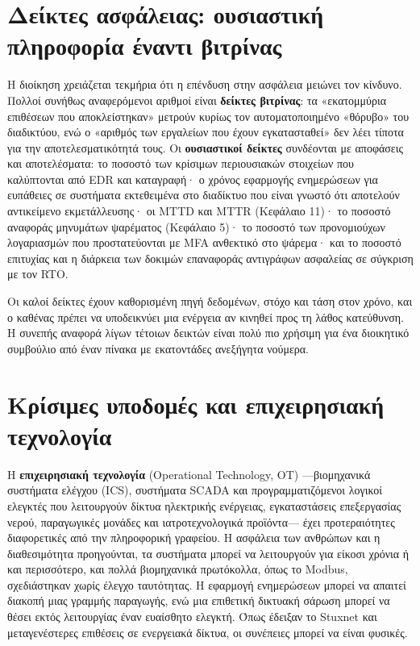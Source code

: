 \section{Δείκτες ασφάλειας: ουσιαστική πληροφορία έναντι βιτρίνας}\label{sec:13.5}
Η διοίκηση χρειάζεται τεκμήρια ότι η επένδυση στην ασφάλεια μειώνει τον κίνδυνο. Πολλοί συνήθως αναφερόμενοι αριθμοί είναι \textbf{δείκτες βιτρίνας}: τα «εκατομμύρια επιθέσεων που αποκλείστηκαν» μετρούν κυρίως τον αυτοματοποιημένο «θόρυβο» του διαδικτύου, ενώ ο «αριθμός των εργαλείων που έχουν εγκατασταθεί» δεν λέει τίποτα για την αποτελεσματικότητά τους. Οι \textbf{ουσιαστικοί δείκτες} συνδέονται με αποφάσεις και αποτελέσματα: το ποσοστό των κρίσιμων περιουσιακών στοιχείων που καλύπτονται από EDR και καταγραφή· ο χρόνος εφαρμογής ενημερώσεων για ευπάθειες σε συστήματα εκτεθειμένα στο διαδίκτυο που είναι γνωστό ότι αποτελούν αντικείμενο εκμετάλλευσης· οι MTTD και MTTR (Κεφάλαιο 11)· το ποσοστό αναφοράς μηνυμάτων ψαρέματος (Κεφάλαιο 5)· το ποσοστό των προνομιούχων λογαριασμών που προστατεύονται με MFA ανθεκτικό στο ψάρεμα· και το ποσοστό επιτυχίας και η διάρκεια των δοκιμών επαναφοράς αντιγράφων ασφαλείας σε σύγκριση με τον RTO.

Οι καλοί δείκτες έχουν καθορισμένη πηγή δεδομένων, στόχο και τάση στον χρόνο, και ο καθένας πρέπει να υποδεικνύει μια ενέργεια αν κινηθεί προς τη λάθος κατεύθυνση. Η συνεπής αναφορά λίγων τέτοιων δεικτών είναι πολύ πιο χρήσιμη για ένα διοικητικό συμβούλιο από έναν πίνακα με εκατοντάδες ανεξήγητα νούμερα.

\section{Κρίσιμες υποδομές και επιχειρησιακή τεχνολογία}\label{sec:13.6}
Η \textbf{επιχειρησιακή τεχνολογία} (Operational Technology, OT) —βιομηχανικά συστήματα ελέγχου (ICS), συστήματα SCADA και προγραμματιζόμενοι λογικοί ελεγκτές που λειτουργούν δίκτυα ηλεκτρικής ενέργειας, εγκαταστάσεις επεξεργασίας νερού, παραγωγικές μονάδες και ιατροτεχνολογικά προϊόντα— έχει προτεραιότητες διαφορετικές από την πληροφορική γραφείου. Η ασφάλεια των ανθρώπων και η διαθεσιμότητα προηγούνται, τα συστήματα μπορεί να λειτουργούν για είκοσι χρόνια ή και περισσότερο, και πολλά βιομηχανικά πρωτόκολλα, όπως το Modbus, σχεδιάστηκαν χωρίς έλεγχο ταυτότητας. Η εφαρμογή ενημερώσεων μπορεί να απαιτεί διακοπή μιας γραμμής παραγωγής, ενώ μια επιθετική δικτυακή σάρωση μπορεί να θέσει εκτός λειτουργίας έναν ευαίσθητο ελεγκτή. Όπως έδειξαν το Stuxnet και μεταγενέστερες επιθέσεις σε ενεργειακά δίκτυα, οι συνέπειες μπορεί να είναι φυσικές.

